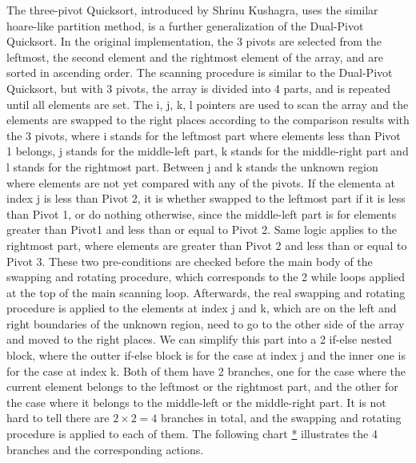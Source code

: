 \documentclass{article}
\begin{document}
The three-pivot Quicksort, introduced by Shrinu Kushagra, uses the similar hoare-like partition method, is a further generalization of the Dual-Pivot Quicksort.
In the original implementation, the 3 pivots are selected from the leftmost, the second element and the rightmost element of the array, and are sorted in ascending order.
The scanning procedure is similar to the Dual-Pivot Quicksort, but with 3 pivots, the array is divided into 4 parts, and is repeated until all elements are set.
The i, j, k, l pointers are used to scan the array and the elements are swapped to the right places according to the comparison results with the 3 pivots,
where i stands for the leftmost part where elements less than Pivot 1 belongs, j stands for the middle-left part, k stands for the middle-right part and l stands for the rightmost part.
Between j and k stands the unknown region where elements are not yet compared with any of the pivots. 
If the elementa at index j is less than Pivot 2, it is whether swapped to the leftmost part if it is less than Pivot 1,
or do nothing otherwise, since the middle-left part is for elements greater than Pivot1 and less than or equal to Pivot 2.
Same logic applies to the rightmost part, where elements are greater than Pivot 2 and less than or equal to Pivot 3.
These two pre-conditions are checked before the main body of the swapping and rotating procedure, which corresponds to the 2 while loops applied at the top of the main scanning loop.
Afterwards, the real swapping and rotating procedure is applied to the elements at index j and k, which are on the left and right boundaries of the unknown region, need to go to the other side of the array and moved to the right places.
We can simplify this part into a 2 if-else nested block, where the outter if-else block is for the case at index j and the inner one is for the case at index k.
Both of them have 2 branches, one for the case where the current element belongs to the leftmost or the rightmost part, and the other for the case where it belongs to the middle-left or the middle-right part.
It is not hard to tell there are $2 \times 2 = 4$ branches in total, and the swapping and rotating procedure is applied to each of them. The following chart \hyperlink{fig:3pivot}{*} illustrates the 4 branches and the corresponding actions.
\end{document}
